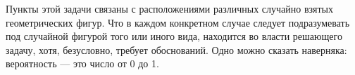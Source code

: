 \def\mb#1{\mathbb{#1}}
\newcommand{\ol}[1]{\overline{#1}}
\newcommand{\tbf}[1]{\textbf{#1}}

\newcommand\ccup{\mathop{\cup}}
\renewcommand{\dist}{\operatorname{dist}}
\newcommand{\id}{\operatorname{Id}}

\def\bar{\begin{array}}
\def\ear{\end{array}}
\newcommand{\Vol}{\operatorname{Vol}}


Пункты этой задачи связаны с расположениями различных случайно взятых геометрических фигур. Что в каждом конкретном случае следует подразумевать под случайной фигурой того или иного вида, находится во власти решающего задачу, хотя, безусловно, требует обоснований. Одно можно сказать наверняка: вероятность --- это число от 0 до 1.
